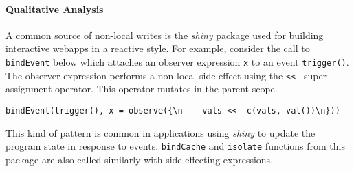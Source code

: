 \documentclass[review,nonacm,screen,acmsmall,anonymous=true]{acmart}
\newcommand{\code}[1]{\lstinline |#1|\xspace}
\begin{document}
\paragraph{Qualitative Analysis}

A common source of non-local writes is the \emph{shiny} package used for
building interactive webapps in a reactive style. For example, consider the call
to \code{bindEvent} below which attaches an observer expression \code{x} to an
event \code{trigger()}. The observer expression performs a non-local side-effect
using the \code{<<-} super-assignment operator. This operator mutates in the
parent scope.
%
\begin{lstlisting}
bindEvent(trigger(), x = observe({\n    vals <<- c(vals, val())\n}))
\end{lstlisting}
%
This kind of pattern is common in applications using \emph{shiny} to update the
program state in response to events. \code{bindCache} and
\code{isolate} functions from this package are also called similarly with
side-effecting expressions.
\end{document}
